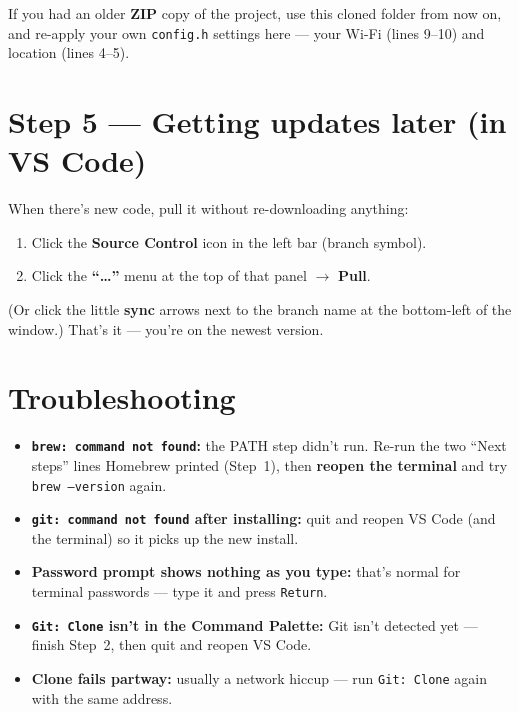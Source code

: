 \documentclass[11pt]{article}
\begin{document}
\begin{warn}
If you had an older \textbf{ZIP} copy of the project, use this cloned folder from now
on, and re-apply your own \texttt{config.h} settings here --- your Wi-Fi (lines 9--10)
and location (lines 4--5).
\end{warn}

\section{Step 5 --- Getting updates later (in VS Code)}
When there's new code, pull it without re-downloading anything:
\begin{enumerate}
  \item Click the \textbf{Source Control} icon in the left bar (branch symbol).
  \item Click the \textbf{``\ldots''} menu at the top of that panel
        \(\rightarrow\) \textbf{Pull}.
\end{enumerate}
(Or click the little \textbf{sync} arrows next to the branch name at the bottom-left of
the window.) That's it --- you're on the newest version.

\section{Troubleshooting}
\begin{itemize}[leftmargin=1.6em]
  \item \textbf{\texttt{brew: command not found}:} the PATH step didn't run. Re-run the
        two ``Next steps'' lines Homebrew printed (Step~1), then \textbf{reopen the
        terminal} and try \texttt{brew --version} again.
  \item \textbf{\texttt{git: command not found} after installing:} quit and reopen VS
        Code (and the terminal) so it picks up the new install.
  \item \textbf{Password prompt shows nothing as you type:} that's normal for terminal
        passwords --- type it and press \texttt{Return}.
  \item \textbf{\texttt{Git: Clone} isn't in the Command Palette:} Git isn't detected
        yet --- finish Step~2, then quit and reopen VS Code.
  \item \textbf{Clone fails partway:} usually a network hiccup --- run \texttt{Git:
        Clone} again with the same address.
\end{itemize}
\end{document}
